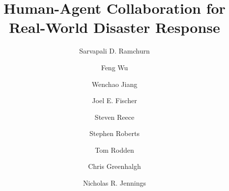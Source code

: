 \documentclass{svjour3}                     %
\begin{document}


\title{Human-Agent Collaboration for Real-World Disaster Response}




%
%
%
%

%

%
\author{Sarvapali D. Ramchurn     \and Feng Wu \and Wenchao Jiang \and Joel E. Fischer  \and Steven Reece \and Stephen Roberts \and Tom Rodden \and Chris Greenhalgh \and  Nicholas R. Jennings 
}

\end{document}
